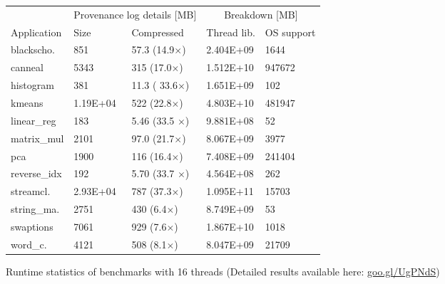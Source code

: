 \begin{figure}[t]
\centering
\myfontsize
\newcommand{\tworowcell}[2][c]{\begin{tabular}[#1]{@{}c@{}}#2\end{tabular}}
{
\begin{tabular}{m{1cm}|m{1cm}|m{1.4cm}|m{1.25cm}|m{1.25cm}}
 &   \multicolumn{2}{c|}{ Provenance log details [MB] }   & \multicolumn{2}{c}{ Breakdown [MB] } \\
   { Application} & Size & Compressed & Thread lib. &  OS support \\
  \hline \hline
    blackscho. 	&	851		& 57.3 (14.9$\times$)	&  2.404E+09& 1644  \\
    canneal  	&	5343		& 315  (17.0$\times$)	&  1.512E+10& 947672   \\
    histogram 	&	381 		&  11.3	( 33.6$\times$)	&  1.651E+09& 102   \\
    kmeans 	&	1.19E+04 	& 522	(22.8$\times$)	&  4.803E+10& 481947   \\
    linear\_reg 	&	183 		& 5.46	(33.5	$\times$)&  9.881E+08& 52   \\
    matrix\_mul 	&	2101  	& 97.0	(21.7$\times$)	&  8.067E+09& 3977   \\
    pca		& 	1900 	& 116	(16.4$\times$)	&  7.408E+09& 241404   \\
    reverse\_idx	&	192 		& 5.70	(33.7	$\times$)&  4.564E+08& 262  \\
    streamcl.	&	2.93E+04 & 787	(37.3$\times$)	&  1.095E+11& 15703  \\
    string\_ma.	&	2751		& 430	(6.4$\times$)		&  8.749E+09& 53  \\
    swaptions	&	7061		& 929	(7.6$\times$)		&  1.867E+10& 1018  \\
    word\_c.	&	4121		& 508	(8.1$\times$)		&  8.047E+09& 21709  \\
\hline
\end{tabular}
}

\caption{Runtime statistics of benchmarks with 16 threads (Detailed results available here: \href{https://goo.gl/UgPNdS}{goo.gl/UgPNdS}) }
\label{tab:apps}
\end{figure}

